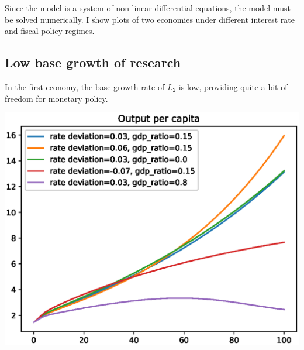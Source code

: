 \documentclass[12pt]{article}
\theoremstyle{definition}
\begin{document}
Since the model is a system of non-linear differential equations, the model must be solved numerically.  I show plots of two economies under different interest rate and fiscal policy regimes.  

\subsection{Low base growth of research}

In the first economy, the base growth rate of \(L_2\) is low, providing quite a bit of freedom for monetary policy.  

\begin{minipage}[c]{0.8\linewidth}
\begin{framed}
\centering
\includegraphics[width=1\textwidth]{images/economy_0}
\end{framed}
\end{minipage}
\end{document}
